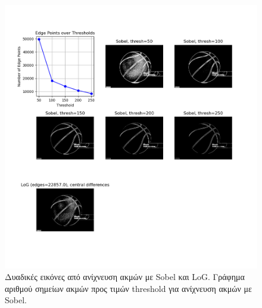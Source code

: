 \documentclass{article}
\begin{document}
\begin{figure}
    \includegraphics[width=\textwidth]{log_n_sobel.png}
    \caption{Δυαδικές εικόνες από ανίχνευση ακμών με Sobel και LoG. Γράφημα αριθμού
    σημείων ακμών προς τιμών threshold για ανίχνευση ακμών με Sobel.}\label{lognsobel}
\end{figure}

\end{document}
